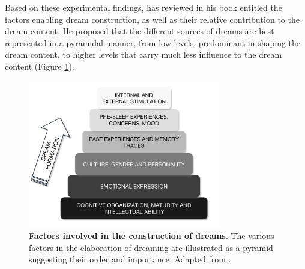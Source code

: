 Based on these experimental findings, \citet{de_koninck_sleep_2012} has reviewed in his book entitled  the factors enabling dream construction, as well as their relative contribution to the dream content. He proposed that the different sources of dreams are best represented in a pyramidal manner, from low levels, predominant in shaping the dream content, to higher levels that carry much less influence to the dream content (Figure \ref{fig:intro:koninck}).

\begin{figure}[htb]
	\centering
	\includegraphics[width=0.75\textwidth]{Fig/Intro/Intro_Pyramid_dream_construction/Intro_pyramid_dream.png}
	\caption[Factors involved in the construction of dreams]{\textbf{Factors involved in the construction of dreams}. The various factors in the elaboration of dreaming are illustrated as a pyramid suggesting their order and importance. Adapted from \citet{de_koninck_sleep_2012}.}
	\label{fig:intro:koninck}
\end{figure}

